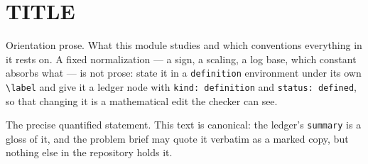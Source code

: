 \documentclass[../main.tex]{subfiles}
\begin{document}
\section{{{TITLE}}}
\label{sec:{{SLUG}}}

Orientation prose. What this module studies and which conventions everything in it
rests on. A fixed normalization — a sign, a scaling, a log base, which constant absorbs
what — is not prose: state it in a \texttt{definition} environment under its own
\texttt{\textbackslash label} and give it a ledger node with \texttt{kind: definition}
and \texttt{status: defined}, so that changing it is a mathematical edit the checker can
see.

\begin{{{KIND}}}
\label{{{NODE}}}
  The precise quantified statement. This text is canonical: the ledger's \texttt{summary}
  is a gloss of it, and the problem brief may quote it verbatim as a marked copy, but
  nothing else in the repository holds it.
\end{{{KIND}}}
\end{document}
